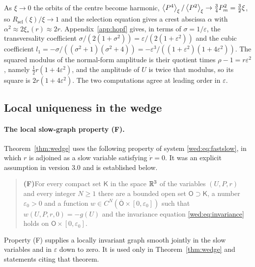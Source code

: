 \begin{remark}\label{wed:rem:hopf}
As $\xi\to0$ the orbits of the centre become harmonic, $\left\langle P^4\right\rangle_\xi/\left\langle P^2\right\rangle_\xi\to\tfrac34P_m^2=\tfrac32\xi$, so $R_{\mathrm{sel}}(\xi)/\xi\to1$ and the selection equation gives a crest abscissa $\alpha$ with $\alpha^2\approx2\xi_*(r)\approx2r$. Appendix~\ref{app:hopf} gives, in terms of $\sigma=1/\varepsilon$, the transversality coefficient $\sigma/(2(1+\sigma^2))=\varepsilon/(2(1+\varepsilon^2))$ and the cubic coefficient $l_1=-\sigma/((\sigma^2+1)(\sigma^2+4))=-\varepsilon^3/((1+\varepsilon^2)(1+4\varepsilon^2))$. The squared modulus of the normal-form amplitude is their quotient times $\rho-1=r\varepsilon^2$, namely $\tfrac12r(1+4\varepsilon^2)$, and the amplitude of $U$ is twice that modulus, so its square is $2r(1+4\varepsilon^2)$. The two computations agree at leading order in $\varepsilon$.
\end{remark}

\subsection{Local uniqueness in the wedge}\label{wed:sec:wedge}
\paragraph{The local slow-graph property \textup{(F)}.}
Theorem~\ref{thm:wedge} uses the following property of system \eqref{wed:eq:fastslow}, in which $r$ is adjoined as a slow variable satisfying $\dot r=0$. It was an explicit assumption in version 3.0 and is established below.
\begin{quote}
\textbf{(F)}\quad For every compact set $\mathsf K$ in the space $\mathbb R^3$ of the variables $(U,P,r)$ and every integer $N\ge1$ there are a bounded open set $\mathsf O\supset\mathsf K$, a number $\varepsilon_0>0$ and a function $w\in C^N(\overline{\mathsf O}\times[0,\varepsilon_0])$ such that $w(U,P,r,0)=-g(U)$ and the invariance equation \eqref{wed:eq:invariance} holds on $\mathsf O\times[0,\varepsilon_0]$.
\end{quote}
Property \textup{(F)} supplies a locally invariant graph smooth jointly in the slow variables and in $\varepsilon$ down to zero. It is used only in Theorem~\ref{thm:wedge} and statements citing that theorem.


\iffalse

